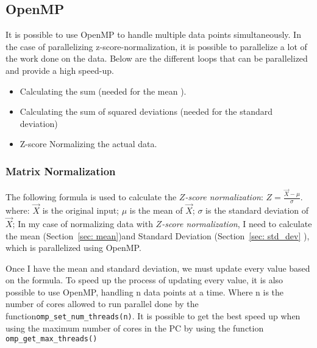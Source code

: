 \documentclass{article}
\newcommand{\zonenorm}{\textit{$Z$-score normalization}}
\begin{document}
\subsection{OpenMP} \label{sec: OpenMP}
It is possible to use OpenMP to handle multiple data points simultaneously.
In the case of parallelizing z-score-normalization, it is possible to parallelize a lot of the work done on the data.
Below are the different loops that can be parallelized and provide a high speed-up.
\begin{itemize}
    \item Calculating the sum (needed for the mean ).
    \item Calculating the sum of squared deviations (needed for the standard deviation)
    \item Z-score Normalizing the actual data.
\end{itemize}



\subsubsection{Matrix Normalization}\label{sec: norm}
The following formula is used to calculate the \zonenorm{}:
$Z = \frac{\vec{X} - \mu}{\sigma}$.
where:
$\vec{X}$ is the original input;
$\mu$ is the mean of $\vec{X}$;
$\sigma$ is the standard deviation of $\vec{X}$;
In my case of normalizing data with \zonenorm{}, I need to calculate the mean (Section~\ref{sec: mean})and Standard Deviation (Section~\ref{sec: std_dev} ), which is parallelized using OpenMP.

Once I have the mean and standard deviation, we must update every value based on the formula.
To speed up the process of updating every value, it is also possible to use OpenMP, handling n data points at a time. Where n is the number of cores allowed to run parallel done by the function\verb|omp_set_num_threads(n)|. It is possible to get the best speed up when using the maximum number of cores in the PC by using the function \verb|omp_get_max_threads()|
\end{document}
